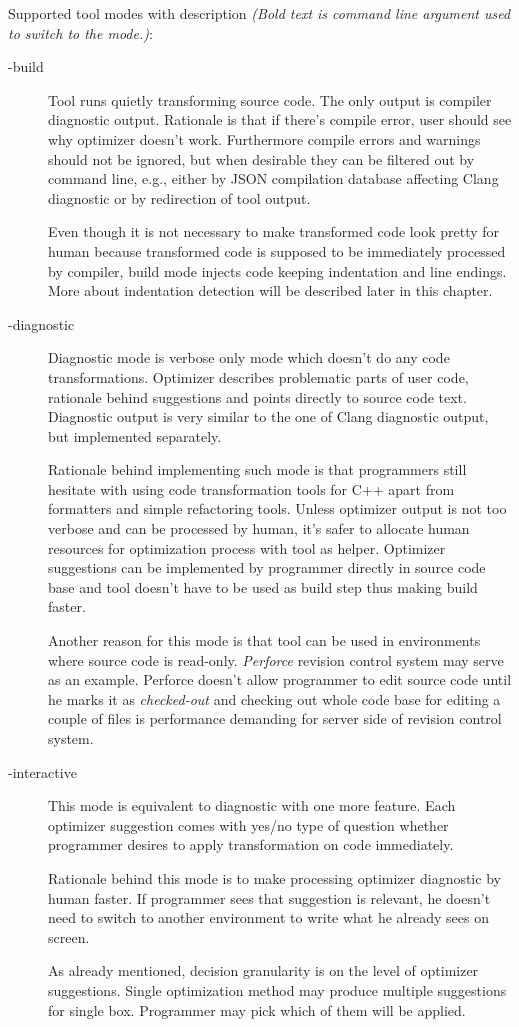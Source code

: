 Supported tool modes with description \textit{(Bold text is command line argument used to switch to the mode.)}:
\begin{description}
\item[-build]{
Tool runs quietly transforming source code. The only output is compiler diagnostic output. Rationale is that if there's compile error, user should see why optimizer doesn't work. Furthermore compile errors and warnings should not be ignored, but when desirable they can be filtered out by command line, e.g., either by JSON compilation database affecting Clang diagnostic or by redirection of tool output.

Even though it is not necessary to make transformed code look pretty for human because transformed code is supposed to be immediately processed by compiler, build mode injects code keeping indentation and line endings. More about indentation detection will be described later in this chapter.
}
\item[-diagnostic]{
Diagnostic mode is verbose only mode which doesn't do any code transformations. Optimizer describes problematic parts of user code, rationale behind suggestions and points directly to source code text. Diagnostic output is very similar to the one of Clang diagnostic output, but implemented separately.

Rationale behind implementing such mode is that programmers still hesitate with using code transformation tools for C++ apart from formatters and simple refactoring tools. Unless optimizer output is not too verbose and can be processed by human, it's safer to allocate human resources for optimization process with tool as helper. Optimizer suggestions can be implemented by programmer directly in source code base and tool doesn't have to be used as build step thus making build faster.

Another reason for this mode is that tool can be used in environments where source code is read-only. \emph{Perforce} revision control system may serve as an example. Perforce doesn't allow programmer to edit source code until he marks it as \emph{checked-out} and checking out whole code base for editing a couple of files is performance demanding for server side of revision control system.
}
\item[-interactive]{
This mode is equivalent to diagnostic with one more feature. Each optimizer suggestion comes with yes/no type of question whether programmer desires to apply transformation on code immediately.

Rationale behind this mode is to make processing optimizer diagnostic by human faster. If programmer sees that suggestion is relevant, he doesn't need to switch to another environment to write what he already sees on screen.

As already mentioned, decision granularity is on the level of optimizer suggestions. Single optimization method may produce multiple suggestions for single box. Programmer may pick which of them will be applied.
}
\end{description}

